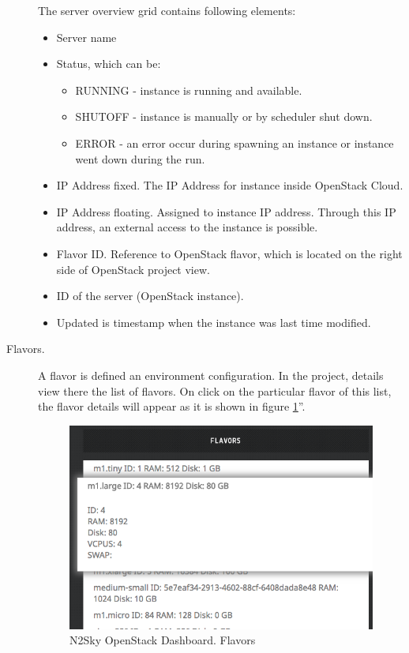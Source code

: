 \begin{description}
The server overview grid contains following elements:
\begin{itemize}
\item Server name 
\item Status, which can be: 
\begin{itemize}
\item RUNNING - instance is running and available. 
\item SHUTOFF - instance is manually or by scheduler shut down. 
\item ERROR - an error occur during spawning an instance or instance went down during the run.
\end{itemize}
\item IP Address fixed. The IP Address for instance inside OpenStack Cloud.
\item IP Address floating. Assigned to instance IP address. Through this IP address, an external access to the instance is possible. 
\item Flavor ID. Reference to OpenStack flavor, which is located on the right side of OpenStack project view.
\item ID of the server (OpenStack instance).
\item Updated is timestamp when the instance was last time modified. 
\end{itemize}
\item[Flavors.] A flavor is defined an environment configuration. In the project, details view there the list of flavors. On click on the particular flavor of this list, the flavor details will appear as it is shown in figure \ref{fig:openstack_flavors}''.

 \begin{figure}[htbp]
\begin{center}
  \includegraphics[scale=0.6]{components/4/pics/openstack_flavors.png}
  \caption{N2Sky OpenStack Dashboard. Flavors}
  \label{fig:openstack_flavors}
\end{center}
\end{figure}


\end{description}
